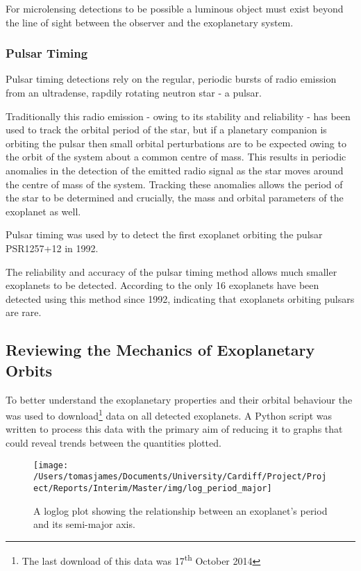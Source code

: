 \documentclass{article}
\begin{document}
For microlensing detections to be possible a luminous object must exist beyond the line of sight between the observer and the exoplanetary system.

\subsubsection{Pulsar Timing}
Pulsar timing detections rely on the regular, periodic bursts of radio emission from an ultradense, rapdily rotating neutron star - a pulsar. 

Traditionally this radio emission - owing to its stability and reliability - has been used to track the orbital period of the star, but if a planetary companion is orbiting the pulsar then small orbital perturbations are to be expected owing to the orbit of the system about a common centre of mass. This results in periodic anomalies in the detection of the emitted radio signal as the star moves around the centre of mass of the system. Tracking these anomalies allows the period of the star to be determined and crucially, the mass and orbital parameters of the exoplanet as well.

Pulsar timing was used by \autocite{first} to detect the first exoplanet orbiting the pulsar PSR1257+12 in 1992. 

The reliability and accuracy of the pulsar timing method allows much smaller exoplanets to be detected. According to the \textcite{exo} only 16 exoplanets have been detected using this method since 1992, indicating that exoplanets orbiting pulsars are rare.


\subsection{Reviewing the Mechanics of Exoplanetary Orbits}
To better understand the exoplanetary properties and their orbital behaviour the \textcite{exo} was used to download\footnote{The last download of this data was 17\textsuperscript{th} October 2014} data on all detected exoplanets. A Python script was written to process this data with the primary aim of reducing it to graphs that could reveal trends between the quantities plotted.

\begin{figure}
\centering
    \texttt{[image: /Users/tomasjames/Documents/University/Cardiff/Project/Project/Reports/Interim/Master/img/log\_period\_major]}
\caption{A loglog plot showing the relationship between an exoplanet's period and its semi-major axis.}\label{log_period_major}
\end{figure}
\end{document}
